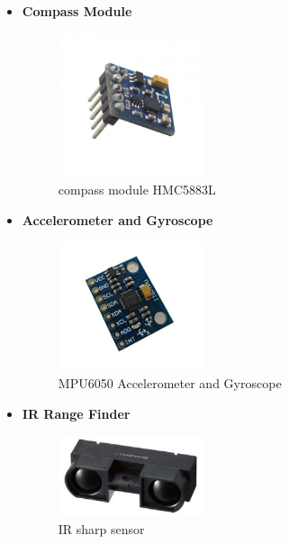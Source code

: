 \documentclass[12pt]{article}
\begin{document}
\begin{itemize}
	\item \textbf{Compass Module}\\
	\begin{figure}[H]
		\centering
		\includegraphics[width =0.4\textwidth]{Fig/Electronics/compass.jpg}
		\caption{compass module HMC5883L}
		\label{fig:compass}
	\end{figure}


	\item \textbf{Accelerometer and Gyroscope}\\
	\begin{figure}[H]
		\centering
		\includegraphics[width =0.4\textwidth]{Fig/Electronics/mpu.jpg}
		\caption{MPU6050 Accelerometer and Gyroscope}
		\label{fig:mpu}
	\end{figure}
		
	\item \textbf{IR Range Finder}\\
	\begin{figure}[H]
		\centering
		\includegraphics[width =0.4\textwidth]{Fig/Electronics/ir.jpg}
		\caption{IR sharp sensor}
		\label{fig:ir}
	\end{figure}
\end{itemize}
\end{document}
